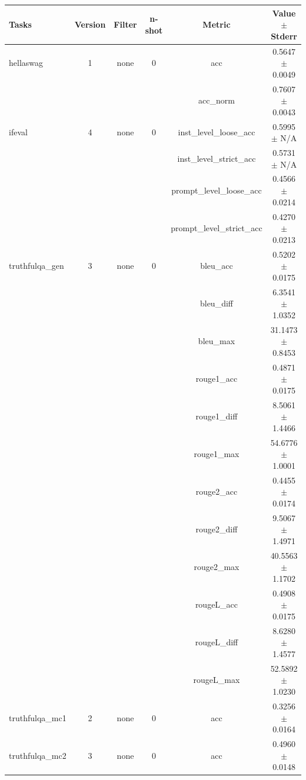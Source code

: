 \documentclass{ifacconf}
\begin{document}
	\vfill
	\clearpage
	\pagebreak
	
	\begin{minipage}{\textwidth}
		\begin{table}[H]
			\centering
			\begin{tabular}{|l|c|c|c|c|c|}
				\hline
				\textbf{Tasks} & \textbf{Version} & \textbf{Filter} & \textbf{n-shot} & \textbf{Metric} & \textbf{Value} $\pm$ \textbf{Stderr} \\ \hline
				hellaswag & 1 & none & 0 & acc & 0.5647 $\pm$ 0.0049 \\ \hline
				& & & & acc\_norm & 0.7607 $\pm$ 0.0043 \\ \hline
				ifeval & 4 & none & 0 & inst\_level\_loose\_acc & 0.5995 $\pm$ N/A \\ \hline
				& & & & inst\_level\_strict\_acc & 0.5731 $\pm$ N/A \\ \hline
				& & & & prompt\_level\_loose\_acc & 0.4566 $\pm$ 0.0214 \\ \hline
				& & & & prompt\_level\_strict\_acc & 0.4270 $\pm$ 0.0213 \\ \hline
				truthfulqa\_gen & 3 & none & 0 & bleu\_acc & 0.5202 $\pm$ 0.0175 \\ \hline
				& & & & bleu\_diff & 6.3541 $\pm$ 1.0352 \\ \hline
				& & & & bleu\_max & 31.1473 $\pm$ 0.8453 \\ \hline
				& & & & rouge1\_acc & 0.4871 $\pm$ 0.0175 \\ \hline
				& & & & rouge1\_diff & 8.5061 $\pm$ 1.4466 \\ \hline
				& & & & rouge1\_max & 54.6776 $\pm$ 1.0001 \\ \hline
				& & & & rouge2\_acc & 0.4455 $\pm$ 0.0174 \\ \hline
				& & & & rouge2\_diff & 9.5067 $\pm$ 1.4971 \\ \hline
				& & & & rouge2\_max & 40.5563 $\pm$ 1.1702 \\ \hline
				& & & & rougeL\_acc & 0.4908 $\pm$ 0.0175 \\ \hline
				& & & & rougeL\_diff & 8.6280 $\pm$ 1.4577 \\ \hline
				& & & & rougeL\_max & 52.5892 $\pm$ 1.0230 \\ \hline
				truthfulqa\_mc1 & 2 & none & 0 & acc & 0.3256 $\pm$ 0.0164 \\ \hline
				truthfulqa\_mc2 & 3 & none & 0 & acc & 0.4960 $\pm$ 0.0148 \\ \hline
			\end{tabular}
			\label{tab:llama31_vptq}
		\end{table}
		

\end{minipage}
\end{document}
